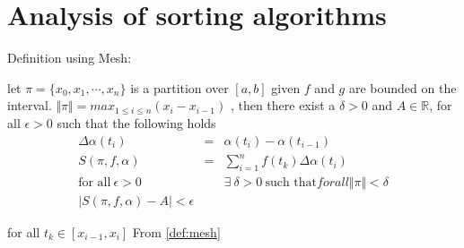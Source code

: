 \documentclass{article}
\begin{document}
\renewcommand{\Re}{\ensuremath{\mathbb{R}}}
\newcommand{\norm}[1]{\ensuremath{\Vert#1\Vert}}
\newcommand{\abs}[1]{\ensuremath{\vert#1\vert}}
\newcommand{\rsSum}{\ensuremath{S(\pi,f,\alpha) }}
\newcommand{\ltwo}[1][]{\ensuremath{L^2#1}}
\newcommand{\para}{
   \vspace{.4cm}
   \ifthenelse { \value{OldSection} < \value{section} }
      { \setcounter{OldSection}{ \value{section} }
        \setcounter{ParCount}{ 0 } }
      {}
   \stepcounter{ParCount}
   \noindent
   \bf \arabic{section}.\arabic{ParCount}. \rm \hspace{.2cm}
 }

\section{Analysis of sorting algorithms}
 Definition using Mesh:

let $\pi=\{x_0, x_1, \cdots, x_n\} $ is a partition over $[a,b]$ given $f$ and $g$ are bounded on the interval. $\norm{\pi} = max_{1\leq i \leq n}(x_i-x_{i-1})$ , then there exist a $\delta > 0$ and $A\in \Re$, for all $\epsilon > 0 $ such that the following holds
\begin{eqnarray}
  \Delta\alpha(t_i) &=& \alpha(t_{i})-\alpha(t_{i-1}) \nonumber \\
  \rsSum  &=& \sum_{i=1}^nf(t_k)\Delta\alpha(t_i) \label{eq:mesh}\\
 \text{for all}\  \epsilon >0 &&  \exists \  \delta >0 \ \text{such that} for all \norm{\pi}<\delta \nonumber \\
   \abs{\rsSum - A} < \epsilon    
 \end{eqnarray}


for all $t_k \in [x_{i-1}, x_i]$
From \ref{def:mesh}
\end{document}
